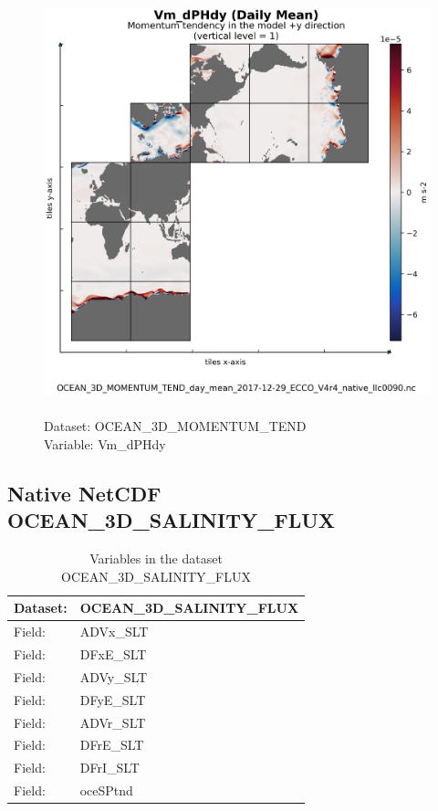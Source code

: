 \begin{figure}[H]
\centering
\includegraphics[scale=0.5]{../images/plots/native_plots/Ocean_Three-Dimensional_Momentum_Tendency/Vm_dPHdy.png}
\caption{\\Dataset: OCEAN\_3D\_MOMENTUM\_TEND\\Variable: Vm\_dPHdy}
\label{tab:table-OCEAN_3D_MOMENTUM_TEND_Vm_dPHdy-Plot}
\end{figure}
\pagebreak
\subsection{Native NetCDF OCEAN\_3D\_SALINITY\_FLUX}
\newp
\begin{longtable}{|p{}|p{}|}
\caption{Variables in the dataset OCEAN\_3D\_SALINITY\_FLUX}
\label{tab:table-OCEAN_3D_SALINITY_FLUX-fields} \\ 
\hline \endhead \hline \endfoot
\rowcolor{lightgray} \textbf{Dataset:} & \textbf{OCEAN\_3D\_SALINITY\_FLUX} \\ \hline
Field: &ADVx\_SLT \\ \hline
Field: &DFxE\_SLT \\ \hline
Field: &ADVy\_SLT \\ \hline
Field: &DFyE\_SLT \\ \hline
Field: &ADVr\_SLT \\ \hline
Field: &DFrE\_SLT \\ \hline
Field: &DFrI\_SLT \\ \hline
Field: &oceSPtnd \\ \hline
\end{longtable}

